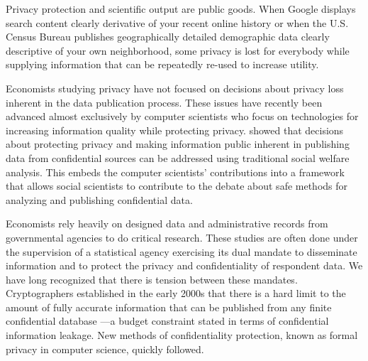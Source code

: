 \documentclass[dvipsnames,finalmode,PP]{AEA}
\begin{document}
\title{\mytitle}
\author{\myauthors}

\date{January 2019}
\pubVolume{}
\pubIssue{}
\maketitle




Privacy protection and scientific output are public goods. When Google displays search content clearly derivative of your recent online history or when the U.S. Census Bureau publishes geographically detailed demographic data clearly descriptive of your own neighborhood, some privacy is lost for everybody while supplying information that can be repeatedly re-used to increase utility.

Economists studying privacy have not focused on decisions about privacy loss inherent in the data publication process. These issues have recently been advanced almost exclusively by computer scientists who focus on technologies for increasing information quality while protecting privacy.
%
\citet{abowdschmutte.aer.2018} showed that decisions about protecting privacy and making information public inherent in publishing data from confidential sources can be addressed using traditional social welfare analysis.
This embeds the computer scientists' contributions into a framework that allows social scientists to contribute to the debate about safe methods for analyzing and publishing confidential data.

Economists rely heavily on designed data and administrative records from governmental agencies to do critical research.
These studies are often done under the supervision of a statistical agency exercising its dual mandate to disseminate
information and to protect the privacy and confidentiality of respondent data. We have long recognized that there is
tension between these mandates. Cryptographers established in the early 2000s that there is a hard limit to the amount
of fully accurate information that can be published from any finite confidential database \citep{Dinur:2003:RIW:773153.773173}---a
budget constraint stated in terms of confidential information leakage. New methods of
confidentiality protection, known as formal privacy in computer science, quickly followed.
\end{document}

